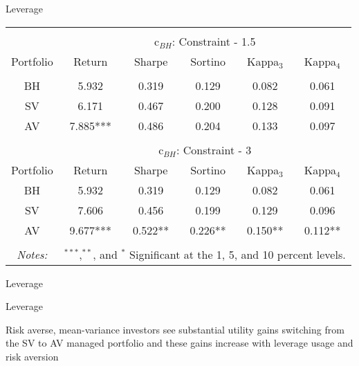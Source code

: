 \documentclass{beamer}
\begin{document}
\begin{frame}{Leverage}
	\begin{adjustbox}{width=\textwidth}
		\begin{tabular}{@{\extracolsep{5pt}} cccccc} 
			\hline \\[-1.8ex] 
			& \multicolumn{5}{c}{c$_{BH}$: Constraint - 1.5}\\
			\cline{2-6}
			Portfolio & Return & Sharpe & Sortino & Kappa$_{3}$ & Kappa$_{4}$\\ 
			\hline \\[-1.8ex] 
			BH & 5.932 & 0.319 & 0.129 & 0.082 & 0.061 \\ 
			SV & 6.171 & 0.467 & 0.200 & 0.128 & 0.091 \\ 
			AV & 7.885*** & 0.486 & 0.204 & 0.133 & 0.097 \\ 
			\hline\\
			& \multicolumn{5}{c}{c$_{BH}$: Constraint - 3}\\
			\cline{2-6}
			Portfolio & Return & Sharpe & Sortino & Kappa$_{3}$ & Kappa$_{4}$\\ 
			BH & 5.932 & 0.319 & 0.129 & 0.082 & 0.061\\
			SV & 7.606 & 0.456 & 0.199 & 0.129 & 0.096\\
			AV & 9.677*** & 0.522** & 0.226** & 0.150** & 0.112**\\
			\hline\\
			\textit{Notes:} & \multicolumn{5}{r}{$^{***}$,$^{**}$, and $^{*}$ Significant at the 1, 5, and 10 percent levels.}
		\end{tabular}
	\end{adjustbox}
\end{frame}

\begin{frame}{Leverage}
	\begin{adjustbox}{width=\textwidth}
		
	\end{adjustbox}
\end{frame}

\begin{frame}{Leverage}
	\begin{adjustbox}{width=\textwidth}
		
	\end{adjustbox}
	Risk averse, mean-variance investors see substantial utility gains switching from the SV to AV managed portfolio and these gains increase with leverage usage and risk aversion
\end{frame}
\end{document}
